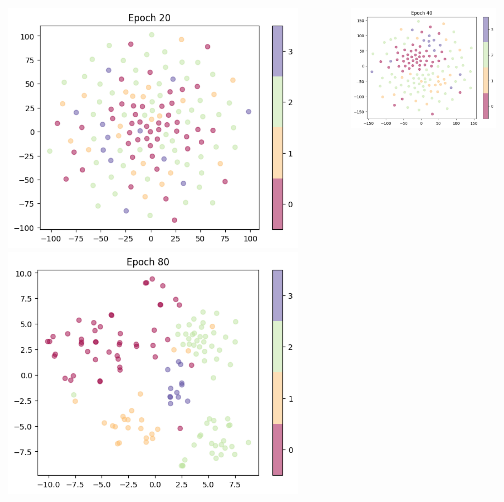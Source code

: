 \documentclass[notes, 10pt, aspectratio=169]{beamer}
\begin{document}
\begin{frame}
\begin{columns}
\begin{column}{0.33\textwidth}
           \includegraphics[width=0.9\textwidth]{./graphics/epoch20.png}
           \includegraphics[width=0.9\textwidth]{./graphics/epoch80.png}
       \end{column}
       \begin{column}{0.33\textwidth}
           \centering
           \includegraphics[width=0.9\textwidth]{./graphics/epoch40.png}

\end{column}
\end{columns}
\end{frame}
\end{document}
